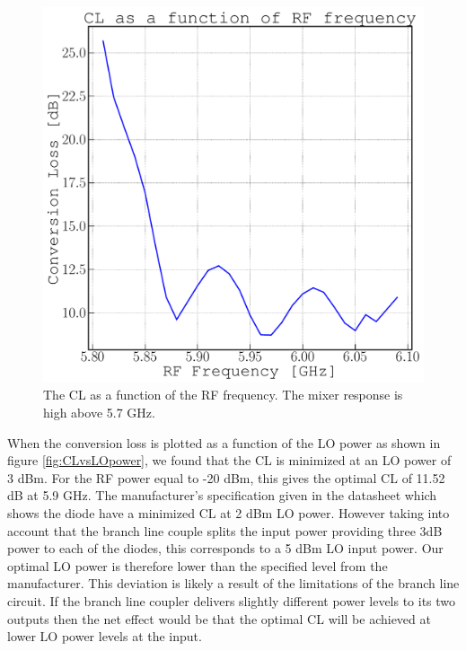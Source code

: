 \documentclass[twocolumn, aps, floatfix]{revtex4-1}
\begin{document}
\begin{figure}[!htbp]
    \includegraphics[scale=0.35]{CL_vs_RF_frequency.pdf}
    \caption{The CL as a function of the RF frequency. The mixer response is high above 5.7 GHz.}
    \label{fig:CLvsRFfrequency}
\end{figure}

When the conversion loss is plotted as a function of the LO power as shown in figure \ref{fig:CLvsLOpower}, we found that the CL is minimized at an LO power of 3 dBm. For the RF power equal to -20 dBm, this gives the optimal CL of 11.52 dB at 5.9 GHz. The manufacturer's specification given in the datasheet which shows the diode have a minimized CL at 2 dBm LO power. However taking into account that the branch line couple splits the input power providing three 3dB power to each of the diodes, this corresponds to a 5 dBm LO input power. Our optimal LO power is therefore lower than the specified level from the manufacturer. This deviation is likely a result of the limitations of the branch line circuit. If the branch line coupler delivers slightly different power levels to its two outputs then the net effect would be that the optimal CL will be achieved at lower LO power levels at the input. 
\end{document}
